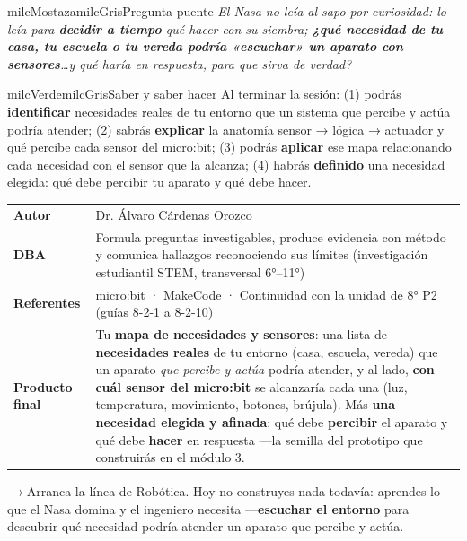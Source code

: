 \documentclass[11pt,letterpaper]{article}
\newcommand{\puente}[1]{%
  \begin{puentebox}%
    \textcolor{milcGradeDark}{$\rightarrow$}\hspace{2mm}#1%
  \end{puentebox}%
}
\begin{document}
\begin{softbox}{milcMostaza}{milcGris}{Pregunta-puente}
\textit{El Nasa no leía al sapo por curiosidad: lo leía para \textbf{decidir a tiempo} qué hacer con su siembra; \textbf{¿qué necesidad de tu casa, tu escuela o tu vereda podría «escuchar» un aparato con sensores}\ldots y qué haría en respuesta, para que sirva de verdad?}
\end{softbox}

\begin{softbox}{milcVerde}{milcGris}{Saber y saber hacer}
Al terminar la sesión: (1) podrás \textbf{identificar} necesidades reales de tu entorno que un sistema que percibe y actúa podría atender; (2) sabrás \textbf{explicar} la anatomía sensor → lógica → actuador y qué percibe cada sensor del micro:bit; (3) podrás \textbf{aplicar} ese mapa relacionando cada necesidad con el sensor que la alcanza; (4) habrás \textbf{definido} una necesidad elegida: qué debe percibir tu aparato y qué debe hacer.
\end{softbox}



\small
\begin{tabularx}{\textwidth}{>{\bfseries}p{3.0cm}Y}
Autor & Dr. Álvaro Cárdenas Orozco\\
DBA & Formula preguntas investigables, produce evidencia con método y comunica hallazgos reconociendo sus límites (investigación estudiantil STEM, transversal 6°--11°)\\
Referentes & micro:bit · MakeCode · Continuidad con la unidad de 8° P2 (guías 8-2-1 a 8-2-10)\\
Producto final & Tu \textbf{mapa de necesidades y sensores}: una lista de \textbf{necesidades reales} de tu entorno (casa, escuela, vereda) que un aparato \emph{que percibe y actúa} podría atender, y al lado, \textbf{con cuál sensor del micro:bit} se alcanzaría cada una (luz, temperatura, movimiento, botones, brújula). Más \textbf{una necesidad elegida y afinada}: qué debe \textbf{percibir} el aparato y qué debe \textbf{hacer} en respuesta ---la semilla del prototipo que construirás en el módulo 3.\\
\end{tabularx}
\normalsize

\puente{Arranca la línea de Robótica. Hoy no construyes nada todavía: aprendes lo que el Nasa domina y el ingeniero necesita ---\textbf{escuchar el entorno} para descubrir qué necesidad podría atender un aparato que percibe y actúa.}
\end{document}

